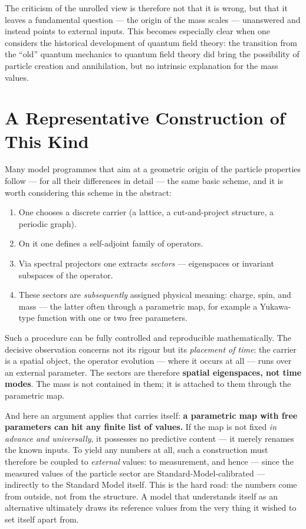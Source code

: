 The criticism of the unrolled view is therefore not that it is wrong, but that it leaves a fundamental question --- the origin of the mass scales --- unanswered and instead points to external inputs. This becomes especially clear when one considers the historical development of quantum field theory: the transition from the ``old'' quantum mechanics to quantum field theory did bring the possibility of particle creation and annihilation, but no intrinsic explanation for the mass values.

\section{A Representative Construction of This Kind}

Many model programmes that aim at a geometric origin of the particle properties follow --- for all their differences in detail --- the same basic scheme, and it is worth considering this scheme in the abstract:

\begin{enumerate}[leftmargin=1.6em,itemsep=0.2em]
 \item One chooses a discrete carrier (a lattice, a cut-and-project structure, a periodic graph).
 \item On it one defines a self-adjoint family of operators.
 \item Via spectral projectors one extracts \emph{sectors} --- eigenspaces or invariant subspaces of the operator.
 \item These sectors are \emph{subsequently} assigned physical meaning: charge, spin, and mass --- the latter often through a parametric map, for example a Yukawa-type function with one or two free parameters.
\end{enumerate}

Such a procedure can be fully controlled and reproducible mathematically. The decisive observation concerns not its rigour but its \emph{placement of time}: the carrier is a spatial object, the operator evolution --- where it occurs at all --- runs over an external parameter. The sectors are therefore \textbf{spatial eigenspaces, not time modes}. The mass is not contained in them; it is attached to them through the parametric map.

And here an argument applies that carries itself: \textbf{a parametric map with free parameters can hit any finite list of values.} If the map is not fixed \emph{in advance and universally}, it possesses no predictive content --- it merely renames the known inputs. To yield any numbers at all, such a construction must therefore be coupled to \emph{external} values: to measurement, and hence --- since the measured values of the particle sector are Standard-Model-calibrated --- indirectly to the Standard Model itself. This is the hard road: the numbers come from outside, not from the structure. A model that understands itself as an alternative ultimately draws its reference values from the very thing it wished to set itself apart from.


